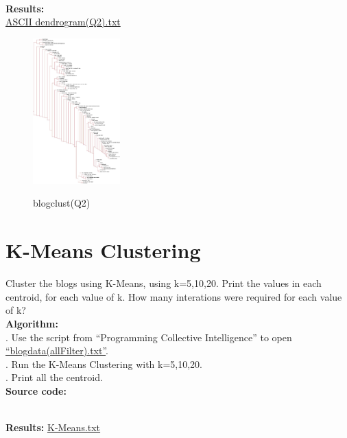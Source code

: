 \documentclass{article}
\begin{document}
		\noindent\\\textbf{Results:}\\
		\indent\href{https://github.com/zhangboroy/cs532-s17/blob/master/assg08_submission/ASCII%20dendrogram(Q2).txt}{ASCII dendrogram(Q2).txt}\\
		\begin{figure}[!htb]
			\centering 
			\href{https://github.com/zhangboroy/cs532-s17/blob/master/assg08_submission/blogclust(Q2).jpg}
			{\includegraphics[width=0.3\textwidth]{blogclust(Q2).jpg}}
			\label{fig:blogclust(Q2)}
			\caption{blogclust(Q2)}
		\end{figure}

		\section{K-Means Clustering}
		Cluster the blogs using K-Means, using k=5,10,20. Print the values in each centroid, for each value of k. How many interations were required for each value of k?\\

		\noindent\textbf{Algorithm:}\\
		. Use the script from ``Programming Collective Intelligence'' to open \href{https://github.com/zhangboroy/cs532-s17/blob/master/assg08_submission/blogdata(allFilter).txt}{``blogdata(allFilter).txt''}.\\
		. Run the K-Means Clustering with k=5,10,20.\\
		. Print all the centroid.\\

		\noindent\textbf{Source code:}
		

		\noindent\\\textbf{Results: }\href{https://github.com/zhangboroy/cs532-s17/blob/master/assg08_submission/K-Means.txt}{K-Means.txt}\\
\end{document}
